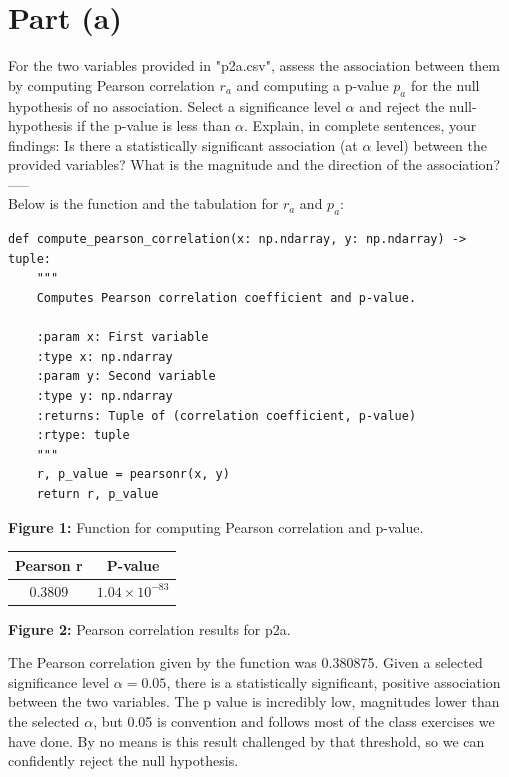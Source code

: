 \section{Part (a)}
For the two variables provided in "p2a.csv", assess the association between them by computing Pearson correlation $r_a$ and computing a p-value $p_a$ for the null hypothesis of no association. Select a significance level $\alpha$ and reject the null-hypothesis if the p-value is less than $\alpha$. Explain, in complete sentences, your findings: Is there a statistically significant association (at $\alpha$ level) between the provided variables? What is the magnitude and the direction of the association?\\
-----\\

Below is the function and the tabulation for $ r_a $ and $ p_a $:

\begin{verbatim}
def compute_pearson_correlation(x: np.ndarray, y: np.ndarray) -> tuple:
    """
    Computes Pearson correlation coefficient and p-value.
    
    :param x: First variable
    :type x: np.ndarray
    :param y: Second variable
    :type y: np.ndarray
    :returns: Tuple of (correlation coefficient, p-value)
    :rtype: tuple
    """
    r, p_value = pearsonr(x, y)
    return r, p_value
\end{verbatim}

\begin{center}
\textbf{Figure 1:} Function for computing Pearson correlation and p-value.
\end{center}

\begin{center}
\begin{tabular}{|c|c|}
\hline
\textbf{Pearson r} & \textbf{P-value} \\
\hline
0.3809 & $ 1.04 \times 10^{-83} $ \\
\hline
\end{tabular}
\end{center}

\begin{center}
\textbf{Figure 2:} Pearson correlation results for p2a.
\end{center}

The Pearson correlation given by the function was 0.380875. Given a selected significance level $ \alpha = 0.05 $, there is a statistically significant, positive association between the two variables. The p value is incredibly low, magnitudes lower than the selected $ \alpha $, but 0.05 is convention and follows most of the class exercises we have done. By no means is this result challenged by that threshold, so we can confidently reject the null hypothesis.

\newpage
